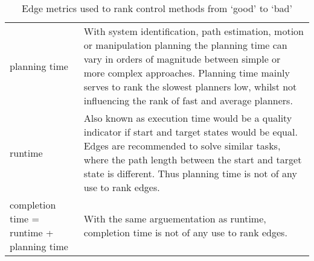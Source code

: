 \begin{table}[htb!]
\begin{tabular}[t]{p{3.7cm} p{10cm}}
planning time& With system identification, path estimation, motion or manipulation planning the planning time can vary in orders of magnitude between simple or more complex approaches. Planning time mainly serves to rank the slowest planners low, whilst not influencing the rank of fast and average planners.\\
runtime& Also known as execution time would be a quality indicator if start and target states would be equal. Edges are recommended to solve similar tasks, where the path length between the start and target state is different. Thus planning time is not of any use to rank edges.\\
completion time = \newline runtime + planning time & With the same arguementation as runtime, completion time is not of any use to rank edges.\\
\end{tabular}
\caption{Edge metrics used to rank control methods from `good' to `bad'}
\label{table:review_edge_metrics}
\end{table}
